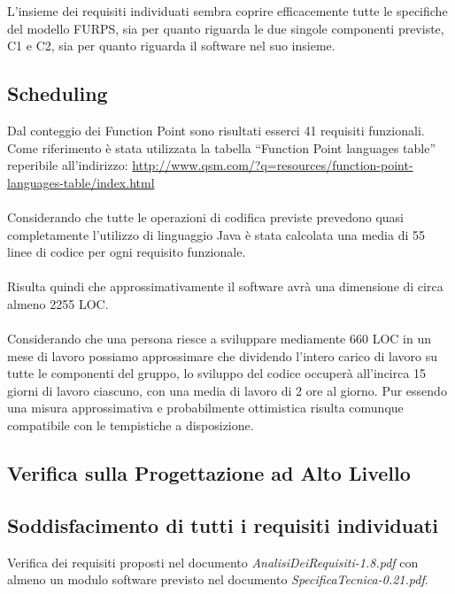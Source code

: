 L'insieme dei requisiti individuati sembra coprire efficacemente tutte le
specifiche del modello FURPS, sia per quanto riguarda le due singole componenti
previste, C1 e C2, sia per quanto riguarda il software nel suo insieme.

\subsection*{Scheduling}

Dal conteggio dei Function Point sono risultati esserci 41 requisiti
funzionali. Come riferimento \`e stata utilizzata la tabella ``Function Point
languages table'' reperibile all'indirizzo:
\url{http://www.qsm.com/?q=resources/function-point-languages-table/index.html}
\\\\
Considerando che tutte le operazioni di codifica previste prevedono quasi
completamente l'utilizzo di linguaggio Java \`e stata calcolata una media di 55
linee di codice per ogni requisito funzionale.
\\\\
Risulta quindi che approssimativamente il software avr\`a una dimensione di
circa almeno 2255 LOC.
\\\\
Considerando che una persona riesce a sviluppare mediamente 660 LOC in un mese
di lavoro possiamo approssimare che dividendo l'intero carico di lavoro su tutte le
componenti del gruppo, lo sviluppo del codice occuper\`a all'incirca
15 giorni di lavoro ciascuno, con una media di lavoro di 2 ore al giorno. Pur
essendo una misura approssimativa e probabilmente ottimistica risulta comunque
compatibile con le tempistiche a disposizione.

\subsection{Verifica sulla Progettazione ad Alto Livello}

\subsection*{Soddisfacimento di tutti i requisiti individuati}

Verifica dei requisiti proposti nel documento \emph{AnalisiDeiRequisiti-1.8.pdf}
con almeno un modulo software previsto nel documento
\emph{SpecificaTecnica-0.21.pdf}.

